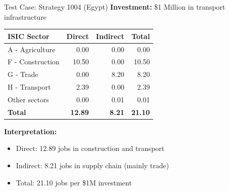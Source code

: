 \documentclass[10pt]{beamer}
\begin{document}
\begin{frame}{Test Case: Strategy 1004 (Egypt)}
\textbf{Investment:} \$1 Million in transport infrastructure

\vspace{0.5cm}

\begin{table}[]
\centering
\small
\begin{tabular}{@{}lrrr@{}}
\toprule
\textbf{ISIC Sector} & \textbf{Direct} & \textbf{Indirect} & \textbf{Total} \\ \midrule
A - Agriculture & 0.00 & 0.00 & 0.00 \\
F - Construction & 10.50 & 0.00 & 10.50 \\
G - Trade & 0.00 & 8.20 & 8.20 \\
H - Transport & 2.39 & 0.00 & 2.39 \\
Other sectors & 0.00 & 0.01 & 0.01 \\ \midrule
\textbf{Total} & \textbf{12.89} & \textbf{8.21} & \textbf{21.10} \\ \bottomrule
\end{tabular}
\end{table}

\vspace{0.3cm}

\textbf{Interpretation:}
\begin{itemize}
    \item Direct: 12.89 jobs in construction and transport
    \item Indirect: 8.21 jobs in supply chain (mainly trade)
    \item Total: 21.10 jobs per \$1M investment
\end{itemize}
\end{frame}
\end{document}
